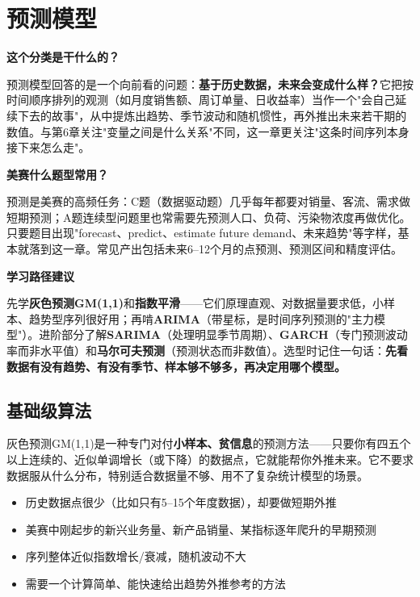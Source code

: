 \chapter{预测模型}

\begin{chapteroverview}
\textbf{这个分类是干什么的？}

预测模型回答的是一个向前看的问题：\textbf{基于历史数据，未来会变成什么样？}它把按时间顺序排列的观测（如月度销售额、周订单量、日收益率）当作一个"会自己延续下去的故事"，从中提炼出趋势、季节波动和随机惯性，再外推出未来若干期的数值。与第6章关注"变量之间是什么关系"不同，这一章更关注"这条时间序列本身接下来怎么走"。

\textbf{美赛什么题型常用？}

预测是美赛的高频任务：C题（数据驱动题）几乎每年都要对销量、客流、需求做短期预测；A题连续型问题里也常需要先预测人口、负荷、污染物浓度再做优化。只要题目出现"forecast、predict、estimate future demand、未来趋势"等字样，基本就落到这一章。常见产出包括未来6--12个月的点预测、预测区间和精度评估。

\textbf{学习路径建议}

先学\textbf{灰色预测GM(1,1)}和\textbf{指数平滑}——它们原理直观、对数据量要求低，小样本、趋势型序列很好用；再啃\textbf{ARIMA}（带星标，是时间序列预测的"主力模型"）。进阶部分了解\textbf{SARIMA}（处理明显季节周期）、\textbf{GARCH}（专门预测波动率而非水平值）和\textbf{马尔可夫预测}（预测状态而非数值）。选型时记住一句话：\textbf{先看数据有没有趋势、有没有季节、样本够不够多，再决定用哪个模型。}
\end{chapteroverview}

\section{基础级算法}


\begin{algointro}
灰色预测GM(1,1)是一种专门对付\textbf{小样本、贫信息}的预测方法——只要你有四五个以上连续的、近似单调增长（或下降）的数据点，它就能帮你外推未来。它不要求数据服从什么分布，特别适合数据量不够、用不了复杂统计模型的场景。
\end{algointro}

\begin{algoscene}
\begin{itemize}
    \item 历史数据点很少（比如只有5--15个年度数据），却要做短期外推
    \item 美赛中刚起步的新兴业务量、新产品销量、某指标逐年爬升的早期预测
    \item 序列整体近似指数增长/衰减，随机波动不大
    \item 需要一个计算简单、能快速给出趋势外推参考的方法
\end{itemize}
\end{algoscene}

